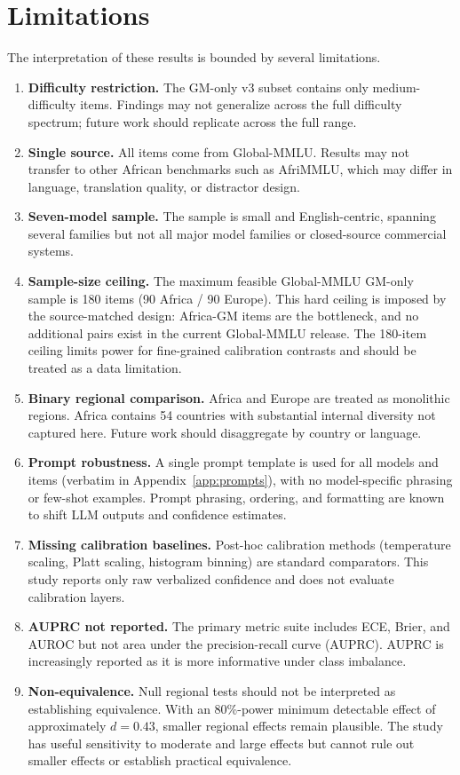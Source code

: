 \documentclass[11pt]{article}
\begin{document}
\section{Limitations}
\label{sec:limitations}

The interpretation of these results is bounded by several limitations.

{\small
\begin{enumerate}\setlength\itemsep{0pt}
    \item \textbf{Difficulty restriction.} The GM-only v3 subset contains only medium-difficulty items. Findings may not generalize across the full difficulty spectrum; future work should replicate across the full range.
    \item \textbf{Single source.} All items come from Global-MMLU. Results may not transfer to other African benchmarks such as AfriMMLU, which may differ in language, translation quality, or distractor design.
    \item \textbf{Seven-model sample.} The sample is small and English-centric, spanning several families but not all major model families or closed-source commercial systems.
    \item \textbf{Sample-size ceiling.} The maximum feasible Global-MMLU GM-only sample is 180 items (90 Africa / 90 Europe). This hard ceiling is imposed by the source-matched design: Africa-GM items are the bottleneck, and no additional pairs exist in the current Global-MMLU release. The 180-item ceiling limits power for fine-grained calibration contrasts and should be treated as a data limitation.
    \item \textbf{Binary regional comparison.} Africa and Europe are treated as monolithic regions. Africa contains 54 countries with substantial internal diversity not captured here. Future work should disaggregate by country or language.
    \item \textbf{Prompt robustness.} A single prompt template is used for all models and items (verbatim in Appendix~\ref{app:prompts}), with no model-specific phrasing or few-shot examples. Prompt phrasing, ordering, and formatting are known to shift LLM outputs and confidence estimates.
    \item \textbf{Missing calibration baselines.} Post-hoc calibration methods (temperature scaling, Platt scaling, histogram binning) are standard comparators. This study reports only raw verbalized confidence and does not evaluate calibration layers.
    \item \textbf{AUPRC not reported.} The primary metric suite includes ECE, Brier, and AUROC but not area under the precision-recall curve (AUPRC). AUPRC is increasingly reported as it is more informative under class imbalance.
    \item \textbf{Non-equivalence.} Null regional tests should not be interpreted as establishing equivalence. With an 80\%-power minimum detectable effect of approximately $d = 0.43$, smaller regional effects remain plausible. The study has useful sensitivity to moderate and large effects but cannot rule out smaller effects or establish practical equivalence.
\end{enumerate}
}
\end{document}

